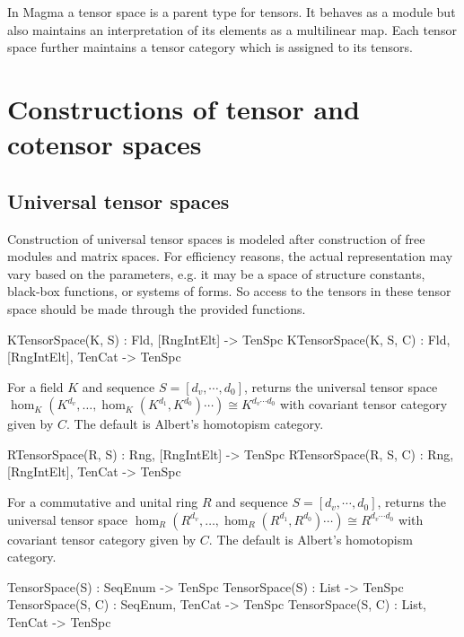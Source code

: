 
In Magma a tensor space is a parent type for tensors.  It behaves
as a module but also maintains an interpretation of its elements as
a multilinear map.  Each tensor space further maintains a tensor category
which is assigned to its tensors.


\section{Constructions of tensor and cotensor spaces}

\subsection{Universal tensor spaces}

Construction of universal tensor spaces is modeled after construction of free 
modules and matrix spaces. For efficiency reasons, the actual representation 
may 
vary based on the parameters, e.g. it may be a space of structure constants, 
black-box functions, or systems of forms. So access to the tensors in these 
tensor space should be made through the provided functions.

\begin{intrinsics}
KTensorSpace(K, S) : Fld, [RngIntElt] -> TenSpc
KTensorSpace(K, S, C) : Fld, [RngIntElt], TenCat -> TenSpc
\end{intrinsics}

For a field $K$ and sequence $S=[d_v,\cdots, d_0]$, 
returns the universal tensor space $\hom_K(K^{d_v},\dots ,\hom_K(K^{d_1},K^{d_0})\cdots )\cong K^{d_v\cdots d_0}$
with covariant tensor category given by $C$.
The default is Albert's homotopism category.

\begin{intrinsics}
RTensorSpace(R, S) : Rng, [RngIntElt] -> TenSpc
RTensorSpace(R, S, C) : Rng, [RngIntElt], TenCat -> TenSpc
\end{intrinsics}

For a commutative and unital ring $R$ and sequence $S=[d_v,\cdots, d_0]$, 
returns the universal tensor space $\hom_R(R^{d_v},\dots ,\hom_R(R^{d_1},R^{d_0})\cdots )\cong R^{d_v\cdots d_0}$
with covariant tensor category given by $C$.
The default is Albert's homotopism category.

\begin{intrinsics}
TensorSpace(S) : SeqEnum -> TenSpc
TensorSpace(S) : List -> TenSpc
TensorSpace(S, C) : SeqEnum, TenCat -> TenSpc
TensorSpace(S, C) : List, TenCat -> TenSpc
\end{intrinsics}

